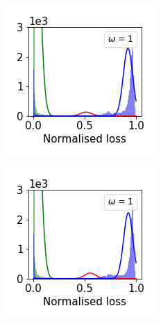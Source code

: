 \documentclass[11pt]{article}
\begin{document}
\begin{figure}[t]
\begin{subfigure}{.18\textwidth}
  \end{subfigure}
  \\
  \begin{subfigure}{.18\textwidth}
    \centering
    \includegraphics[width=\linewidth]{images/loss_dist/EDM_0.6_0.00_cifar100.png} 
  \end{subfigure}
  \begin{subfigure}{.18\textwidth}
    \centering
    \includegraphics[width=\linewidth]{images/loss_dist/EDM_0.6_0.00_imagenet32.png} 

\end{subfigure}
\end{figure}
\end{document}
